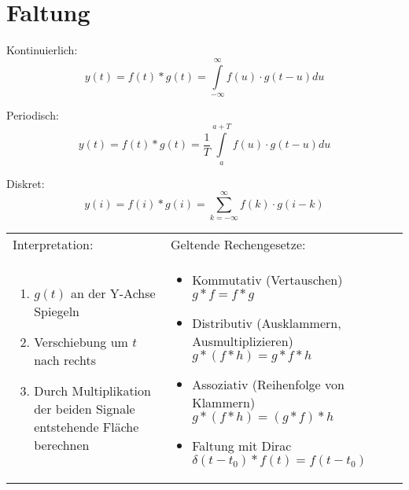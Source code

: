 \section{Faltung}
Kontinuierlich:
\begin{equation}
  \nonumber
  y(t) = f(t) \ast g(t) = \int\limits_{-\infty}^{\infty}f(u) \cdot g(t-u) du
\end{equation}

Periodisch:
\begin{equation}
  \nonumber
  y(t) = f(t) \ast g(t) = \frac{1}{T}\int\limits_{a}^{a + T}f(u) \cdot g(t-u) du
\end{equation}

Diskret:
\begin{equation}
  \nonumber
  y(i)=f(i) \ast g(i)=\sum\limits_{k=-\infty}^{\infty}f(k)\cdot g(i-k)
\end{equation}

\begin{tabular}{p{9cm}p{9cm}}
  Interpretation: & Geltende Rechengesetze:\\
  \begin{enumerate}
    \item $g(t)$ an der Y-Achse Spiegeln
	  \item Verschiebung um $t$ nach rechts
	  \item Durch Multiplikation der beiden Signale entstehende Fläche berechnen
  \end{enumerate}
&
  \begin{itemize}
    \item Kommutativ (Vertauschen) $g \ast f = f \ast g $
	  \item Distributiv (Ausklammern, Ausmultiplizieren) $g \ast(f \ast h) = g \ast f \ast h$
	  \item Assoziativ (Reihenfolge von Klammern) $g \ast(f \ast h) = (g \ast f) \ast h$
	  \item Faltung mit Dirac $\delta(t-t_0) \ast f(t) = f(t-t_0)$
  \end{itemize}
\end{tabular}
	
	
	

